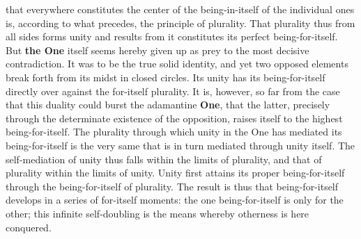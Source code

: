 \documentclass[12pt,a4paper,openany]{book}
\newcommand{\opage}[1]{\marginnote{\footnotesize\textit{[#1]}}}
\begin{document}
that everywhere constitutes the center of the being-in-itself of the individual ones is, according to what precedes, the principle of
plurality. That plurality thus from all sides forms
unity and results from it constitutes its perfect
being-for-itself. But \textbf{the One} itself seems hereby given up as prey to
the most decisive contradiction. It was to be the
true solid identity, and yet two opposed
\setcounter{footnote}{0}%
\opage{19}elements break forth from its midst in closed circles. Its unity has its being-for-itself directly over against
the for-itself plurality. It is, however, so
far from the case that this duality could burst
the adamantine \textbf{One}, that the latter, precisely through the determinate existence of the
opposition, raises itself to the highest being-for-itself. The plurality through which unity
in the One has mediated its being-for-itself is the
very same that is in turn mediated through unity itself.
The self-mediation of unity thus falls within the limits
of plurality, and that of plurality within the limits of unity.
Unity first attains its proper being-for-itself through the being-for-itself of plurality. The result is
thus that being-for-itself develops in a series
of for-itself moments: the one being-for-itself
is only for the other; this infinite self-doubling is the means whereby otherness is here conquered.
\end{document}
